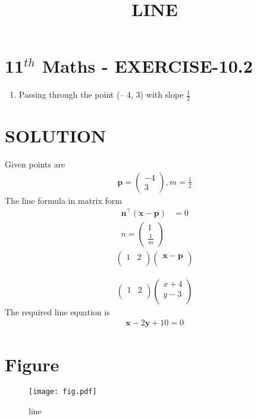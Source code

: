 \documentclass[12pt]{article}
\providecommand{\brak}[1]{\ensuremath{\left(#1\right)}}
\newcommand{\myvec}[1]{\ensuremath{\begin{pmatrix}#1\end{pmatrix}}}
\let\vec\mathbf
\begin{document}
\begin{center}
\title{\textbf{LINE}}
\date{\vspace{-5ex}} %
\maketitle
\end{center}

\section{11$^{th}$ Maths - EXERCISE-10.2}
\begin{enumerate}
\item Passing through the point (– 4, 3) with slope $\frac{1}{2}$
\end{enumerate}
\section{SOLUTION}
Given points are 
\begin{align}
\vec{p}=\myvec{-4\\ 3},
m=\frac{1}{2}
\end{align}
The line formula in matrix form
\begin{align}
\vec{n}^\top\brak{\vec{x}-\vec{p}} &= 0 \\
n=\myvec{1\\ \frac{1}{m}}
\end{align}
\begin{align}
\begin{pmatrix}
    1 &2\\
\end{pmatrix}\begin{pmatrix}
    \vec{x}-\vec{p}\\
\end{pmatrix}
\end{align}

\begin{align}
 \begin{pmatrix}
    1 & 2\\
\end{pmatrix}\begin{pmatrix}
    x+4\\
    y-3\\
\end{pmatrix}
\end{align}
The required line equation is 
\begin{align}
 \vec{x}-2\vec{y}+10=0
\end{align} 
\section{Figure}
\begin{figure}[h]
\texttt{[image: fig.pdf]}
\caption{line}
		\label{fig:Figure}
\end{figure}
\end{document}
